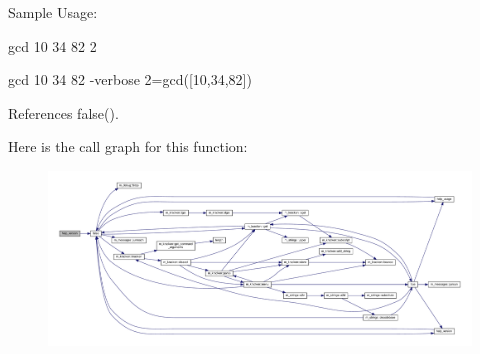 Sample Usage\+:

gcd 10 34 82 2

gcd 10 34 82 -\/verbose 2=gcd(\mbox{[}10,34,82\mbox{]}) 

References false().

Here is the call graph for this function\+:
\nopagebreak
\begin{figure}[H]
\begin{center}
\leavevmode
\includegraphics[width=350pt]{gcd_8f90_a39c21619b08a3c22f19e2306efd7f766_cgraph}
\end{center}
\end{figure}

